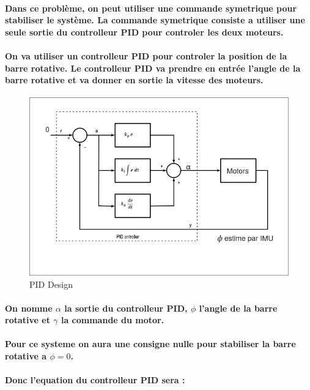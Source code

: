 \paragraph{Dans ce problème, on peut utiliser une commande symetrique pour stabiliser le système. La commande symetrique consiste a utiliser une seule sortie du controlleur PID pour controler les deux moteurs.}

\paragraph{On va utiliser un controlleur PID pour controler la position de la barre rotative. Le controlleur PID va prendre en entrée l'angle de la barre rotative et va donner en sortie la vitesse des moteurs.}


\begin{figure}[!htpb]
	\centering
	\includegraphics[width=\linewidth]{Figures/pid-schema.png}
	\caption{PID Design}
	\label{fig:pid-design}
\end{figure}

\paragraph{On nomme $\alpha$ la sortie du controlleur PID, $\phi$ l'angle de la barre rotative et $\gamma$ la commande du motor.}
\paragraph{Pour ce systeme on aura une consigne nulle pour stabiliser la barre rotative a $\phi = 0$.}

\paragraph{Donc l'equation du controlleur PID sera :}


